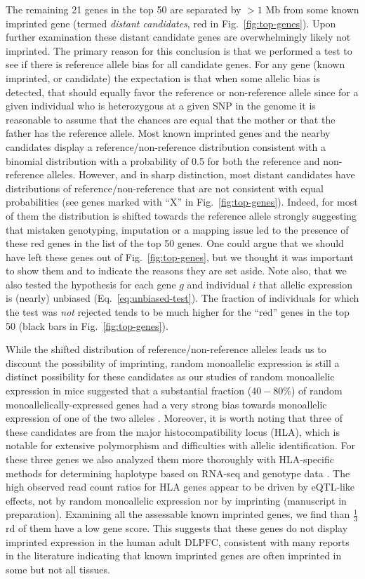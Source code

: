 \documentclass[letterpaper]{article}
\begin{document}
The remaining 21 genes in the top 50 are separated by \(>1\) Mb from some
known imprinted gene (termed \emph{distant candidates}, red in
Fig.~\ref{fig:top-genes}).  Upon further examination these distant candidate
genes are overwhelmingly likely not imprinted. The primary reason for this
conclusion is that we performed a test to see if there is reference allele
bias for all candidate genes. For any gene (known imprinted, or candidate) the
expectation is that when some allelic bias is detected, that should equally
favor the reference or non-reference allele since for a given individual who
is heterozygous at a given SNP in the genome it is reasonable to assume that
the chances are equal that the mother or that the father has the reference
allele. Most known imprinted genes and the nearby candidates display a
reference/non-reference distribution consistent with a binomial distribution
with a probability of 0.5 for both the reference and non-reference alleles.
However, and in sharp distinction, most distant candidates have distributions
of reference/non-reference that are not consistent with equal probabilities
(see genes marked with ``X'' in Fig.~\ref{fig:top-genes}).  Indeed, for most of
them the distribution is shifted towards the reference allele strongly
suggesting that mistaken genotyping, imputation or a mapping issue led to the
presence of these red genes in the list of the top 50 genes. One could argue
that we should have left these genes out of Fig.~\ref{fig:top-genes}, but we
thought it was important to show them and to indicate the reasons they are set
aside.   Note also, that we also tested the hypothesis for each gene \(g\) and
individual \(i\) that allelic expression is (nearly) unbiased
(Eq.~\ref{eq:unbiased-test}).  The fraction of individuals for which the test
was \emph{not} rejected tends to be much higher for the ``red'' genes in the
top 50 (black bars in Fig.~\ref{fig:top-genes}).

While the shifted distribution of reference/non-reference alleles leads us to
discount the possibility of imprinting, random monoallelic expression is still
a distinct possibility for these candidates as our studies of random
monoallelic expression in mice suggested that a substantial fraction
(\(40-80\%\)) of random monoallelically-expressed genes had a very strong bias
towards monoallelic expression of one of the two alleles \cite{Zwemer2012}.
Moreover, it is worth noting that three of these candidates are from the major
histocompatibility locus (HLA), which is notable for extensive polymorphism
and difficulties with allelic identification. For these three genes we also
analyzed them more thoroughly with HLA-specific methods for determining
haplotype based on RNA-seq \cite{Bai2014a} and genotype data \cite{Zheng2014}.
The high observed read count ratios for HLA genes appear to be driven by
eQTL-like effects, not by random monoallelic expression nor by imprinting
(manuscript in preparation).  Examining all the assessable known imprinted
genes, we find than \(\frac{1}{3}\)rd of them have a low gene score. This
suggests that these genes do not display imprinted expression in the human
adult DLPFC, consistent with many reports in the literature indicating that
known imprinted genes are often imprinted in some but not all tissues.  
\end{document}
